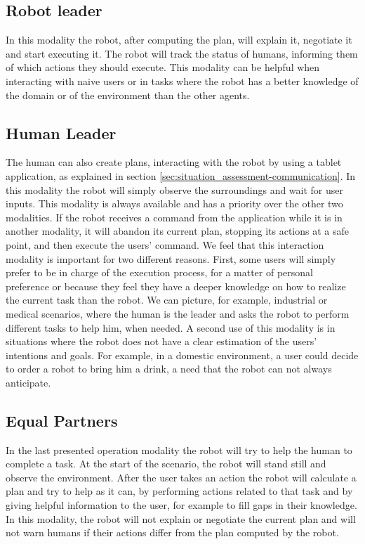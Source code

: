 \subsection{Robot leader}
In this modality the robot, after computing the plan, will explain it, negotiate it and start executing it.
The robot will track the status of humans, informing them of which actions they should execute. This modality can be helpful when interacting with  naive users or in tasks where the robot has a better knowledge of the
domain or of the environment than the other agents.

\subsection{Human Leader}
The human can also create plans, interacting with the robot by using a
tablet application, as explained in section \ref{sec:situation_assessment-communication}. In this modality the robot   
will simply observe the surroundings and wait for user inputs. This modality is always available and has a priority over
the other two modalities. If the robot receives a command from the
application while it is in another modality, it will abandon its current
plan, stopping its actions at a safe point, and then execute the users'
command. We feel that this interaction modality is important for two
different reasons.  First, some users will simply prefer to be in
charge of the execution process, for a matter of personal preference or because they
feel they have a deeper knowledge on how to realize the current task
than the robot. We can picture, for example, industrial or medical
scenarios, where the human is the leader and asks the robot to perform
different tasks to help him, when needed. A second use of this modality is in situations where
the robot does not have  a clear estimation of the users' intentions and
goals. For example, in a domestic environment, a user could decide to
order a robot to bring him a drink, a need that the robot can not always anticipate.

\subsection{Equal Partners}
In the last presented operation modality the robot will try to help
the human to complete a task. At the start of the scenario, the robot
will stand still and observe the environment. After the user takes an
action the robot will calculate a plan and try to help as it can, by
performing actions related to that task and by giving helpful information to
the user, for example to fill gaps in their knowledge. In this modality, 
the robot will not explain or negotiate the current plan and will not warn humans if
their actions differ from the plan computed by the robot.

